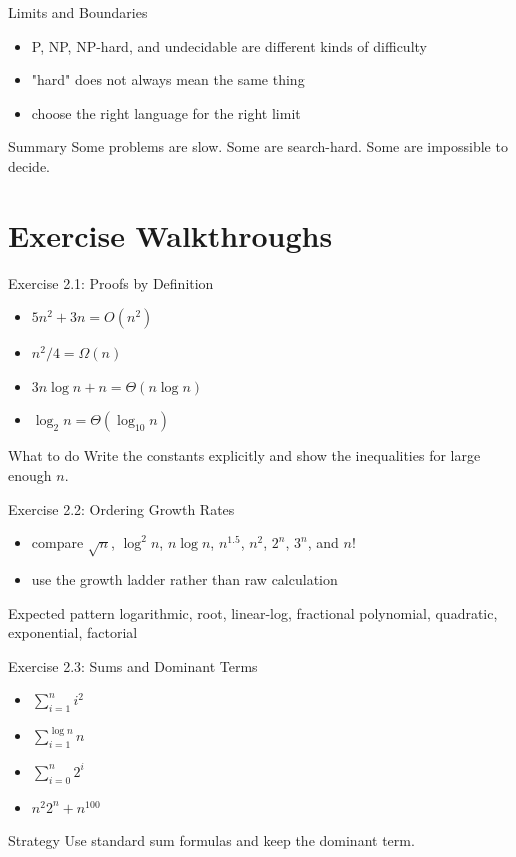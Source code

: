 \documentclass[aspectratio=169,xcolor=dvipsnames]{beamer}
\begin{document}
\begin{frame}{Limits and Boundaries}
  \begin{itemize}
    \item P, NP, NP-hard, and undecidable are different kinds of difficulty
    \item "hard" does not always mean the same thing
    \item choose the right language for the right limit
  \end{itemize}
  \begin{block}{Summary}
    Some problems are slow. Some are search-hard. Some are impossible to decide.
  \end{block}
\end{frame}

\section{Exercise Walkthroughs}
\begin{frame}{Exercise 2.1: Proofs by Definition}
  \begin{itemize}
    \item $5n^2 + 3n = O(n^2)$
    \item $n^2/4 = \Omega(n)$
    \item $3n\log n + n = \Theta(n\log n)$
    \item $\log_2 n = \Theta(\log_{10} n)$
  \end{itemize}
  \begin{block}{What to do}
    Write the constants explicitly and show the inequalities for large enough $n$.
  \end{block}
\end{frame}

\begin{frame}{Exercise 2.2: Ordering Growth Rates}
  \begin{itemize}
    \item compare $\sqrt n$, $\log^2 n$, $n\log n$, $n^{1.5}$, $n^2$, $2^n$, $3^n$, and $n!$
    \item use the growth ladder rather than raw calculation
  \end{itemize}
  \begin{exampleblock}{Expected pattern}
    logarithmic, root, linear-log, fractional polynomial, quadratic, exponential, factorial
  \end{exampleblock}
\end{frame}

\begin{frame}{Exercise 2.3: Sums and Dominant Terms}
  \begin{itemize}
    \item $\sum_{i=1}^{n} i^2$
    \item $\sum_{i=1}^{\log n} n$
    \item $\sum_{i=0}^{n} 2^i$
    \item $n^2 2^n + n^{100}$
  \end{itemize}
  \begin{block}{Strategy}
    Use standard sum formulas and keep the dominant term.
  \end{block}
\end{frame}
\end{document}
